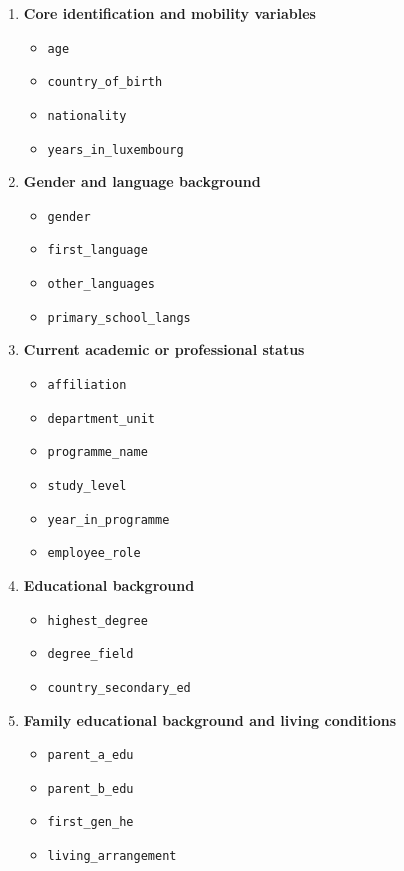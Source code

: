 \documentclass[11pt]{article}
\begin{document}
\begin{enumerate}
    \item \textbf{Core identification and mobility variables}
    \begin{itemize}
        \item \texttt{age}
        \item \texttt{country\_of\_birth}
        \item \texttt{nationality}
        \item \texttt{years\_in\_luxembourg}
    \end{itemize}

    \item \textbf{Gender and language background}
    \begin{itemize}
        \item \texttt{gender}
        \item \texttt{first\_language}
        \item \texttt{other\_languages}
        \item \texttt{primary\_school\_langs}
    \end{itemize}

    \item \textbf{Current academic or professional status}
    \begin{itemize}
        \item \texttt{affiliation}
        \item \texttt{department\_unit}
        \item \texttt{programme\_name}
        \item \texttt{study\_level}
        \item \texttt{year\_in\_programme}
        \item \texttt{employee\_role}
    \end{itemize}

    \item \textbf{Educational background}
    \begin{itemize}
        \item \texttt{highest\_degree}
        \item \texttt{degree\_field}
        \item \texttt{country\_secondary\_ed}
    \end{itemize}

    \item \textbf{Family educational background and living conditions}
    \begin{itemize}
        \item \texttt{parent\_a\_edu}
        \item \texttt{parent\_b\_edu}
        \item \texttt{first\_gen\_he}
        \item \texttt{living\_arrangement}
    \end{itemize}
\end{enumerate}
\end{document}
